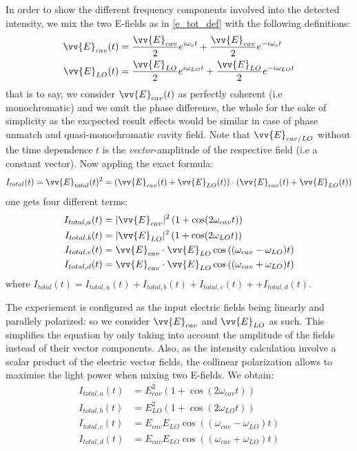 \documentclass[10pt]{report}
\begin{document}
In order to show the different frequency components involved into the detected intensity, we mix the two E-fields as in \eqref{e_tot_def} with the following definitions:
\begin{align}
\label{e_cav_e_lo}
\begin{split}
\vv{E}_{cav}(t) &=\frac{\vv{E}_{cav}}{2} e^{i\omega_{c}t} + \frac{\vv{E}_{cav}}{2} e^{-i\omega_{c}t} \\
\vv{E}_{LO}(t) &= \frac{\vv{E}_{LO}}{2} e^{i\omega_{LO}t} + \frac{\vv{E}_{LO}}{2} e^{-i\omega_{LO}t}
\end{split}
\end{align}that is to say, we consider $\vv{E}_{cav}(t)$ as perfectly coherent (i.e monochromatic) and we omit the phase difference, the whole for the sake of simplicity as the excpected result effects would be similar in case of phase unmatch and quasi-monochromatic cavity field. Note that $\vv{E}_{cav/LO}$ without the time dependence $t$ is the \textit{vector}-amplitude of the respective field (i.e a constant vector). Now appling the exact formula:
\begin{equation}
I_{total}(t) = \vv{E}_{total}(t)^2 = \left(\vv{E}_{cav}(t) + \vv{E}_{LO}(t)\right) \cdot \left(\vv{E}_{cav}(t) + \vv{E}_{LO}(t)\right)
\end{equation} 
one gets four different terms:
\begin{align}
I_{total,a}(t) &= \vert\vv{E}_{cav}\vert^2\left(1 + \cos(2\omega_{cav}t)\right)\\
I_{total,b}(t) &= \vert\vv{E}_{LO}\vert^2\left(1 + \cos(2\omega_{LO}t)\right)\\
I_{total,c}(t) &= \vv{E}_{cav}\cdot\vv{E}_{LO}\cos\left((\omega_{cav} - \omega_{LO})t\right)\\
I_{total,d}(t) &= \vv{E}_{cav}\cdot\vv{E}_{LO}\cos\left((\omega_{cav} + \omega_{LO})t\right)
\end{align}
where $I_{total}(t) = I_{total,a}(t) + I_{total,b}(t) + I_{total,c}(t) + + I_{total,d}(t)$.

The experiement is configured as the input electric fields being linearly and parallely polarized: so we consider $\vv{E}_{cav}$ and $\vv{E}_{LO}$ as such. This simplifies the equation by only taking into account the amplitude of the fields instead of their vector components. Also, as the intensity calculation involve a scalar product of the electric vector fields, the collinear polarization allows to maximise the light power when mixing two E-fields. We obtain:
\begin{align}
I_{total,a}(t) &= E_{cav}^2\left(1 + \cos(2\omega_{cav}t)\right)\\
I_{total,b}(t) &= E_{LO}^2\left(1 + \cos(2\omega_{LO}t)\right)\\
\label{mix_hetero_ic}
I_{total,c}(t) &= E_{cav}E_{LO}\cos\left((\omega_{cav} - \omega_{LO})t\right)\\
\label{mix_hetero_id}
I_{total,d}(t) &= E_{cav}E_{LO}\cos\left((\omega_{cav} + \omega_{LO})t\right)
\end{align}
\end{document}
